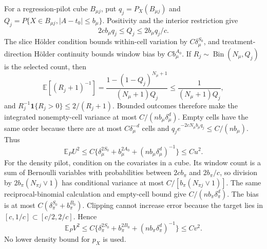 For a regression-pilot cube \(B_{\mu j}\), put \(q_j=P_X(B_{\mu j})\) and \(Q_j=P\{X\in B_{\mu j},\lvert A-t_0\rvert\le b_\mu\}\). Positivity and the interior restriction give
\[
2cb_\mu q_j\le Q_j\le2b_\mu q_j/c.
\]
The slice Hölder condition bounds within-cell variation by \(C\delta_\mu^{S_0}\), and treatment-direction Hölder continuity bounds window bias by \(Cb_\mu^{A_0}\). If \(R_j\sim\operatorname{Bin}(N_\mu,Q_j)\) is the selected count, then
\[
\mathbb E[(R_j+1)^{-1}]=\frac{1-(1-Q_j)^{N_\mu+1}}{(N_\mu+1)Q_j}\le\frac1{(N_\mu+1)Q_j},
\]
and \(R_j^{-1}\mathbf1\{R_j>0\}\le2/(R_j+1)\). Bounded outcomes therefore make the integrated nonempty-cell variance at most \(C/(nb_\mu\delta_\mu^d)\). Empty cells have the same order because there are at most \(C\delta_\mu^{-d}\) cells and \(q_j e^{-2cN_\mu b_\mu q_j}\le C/(nb_\mu)\). Thus
\[
\mathbb E_PU^2\le C\{\delta_\mu^{2S_0}+b_\mu^{2A_0}+(nb_\mu\delta_\mu^d)^{-1}\}\le Cu^2.
\]
For the density pilot, condition on the covariates in a cube. Its window count is a sum of Bernoulli variables with probabilities between \(2cb_\pi\) and \(2b_\pi/c\), so division by \(2b_\pi(N_{\pi j}\vee1)\) has conditional variance at most \(C/[b_\pi(N_{\pi j}\vee1)]\). The same reciprocal-binomial calculation and empty-cell bound give \(C/(nb_\pi\delta_\pi^d)\). The bias is at most \(C(\delta_\pi^{S_0}+b_\pi^{B_0})\). Clipping cannot increase error because the target lies in \([c,1/c]\subset[c/2,2/c]\). Hence
\[
\mathbb E_PV^2\le C\{\delta_\pi^{2S_0}+b_\pi^{2B_0}+(nb_\pi\delta_\pi^d)^{-1}\}\le Cv^2.
\]
No lower density bound for \(p_X\) is used.
